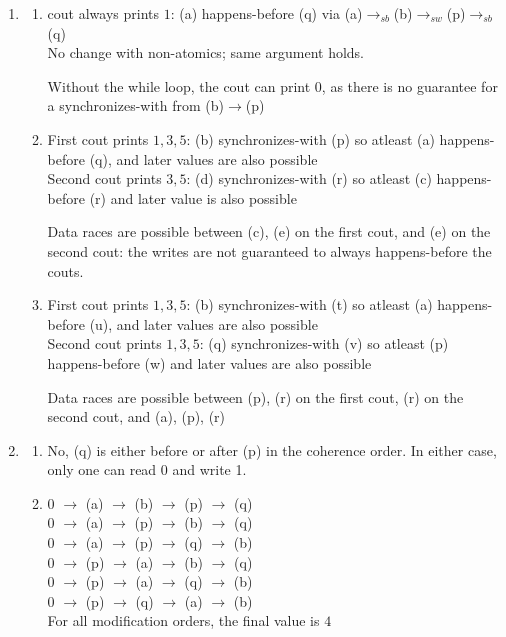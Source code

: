 \documentclass[12pt, a4paper]{article}
\begin{document}
\begin{enumerate}[Q\arabic*.]
  \item 
    \begin{enumerate}
      \item cout always prints $1$: (a) happens-before (q) via (a)$\rightarrow_{sb}$(b)$\rightarrow_{sw}$(p)$\rightarrow_{sb}$(q)\\
        No change with non-atomics; same argument holds. 

        Without the while loop, the cout can print $0$, as there is no guarantee for a synchronizes-with from (b)$\rightarrow$(p)

      \item First cout prints $1,3,5$: (b) synchronizes-with (p) so atleast (a) happens-before (q), and later values are also possible\\ 
        Second cout prints $3,5$: (d) synchronizes-with (r) so atleast (c) happens-before (r) and later value is also possible

        Data races are possible between (c), (e) on the first cout, and (e) on the second cout: the writes are not guaranteed to always happens-before the couts.

      \item First cout prints $1,3,5$: (b) synchronizes-with (t) so atleast (a) happens-before (u), and later values are also possible\\ 
        Second cout prints $1,3,5$: (q) synchronizes-with (v) so atleast (p) happens-before (w) and later values are also possible

        Data races are possible between (p), (r) on the first cout, (r) on the second cout, and (a), (p), (r) 
    \end{enumerate}

  \item 
    \begin{enumerate}
      \item No, (q) is either before or after (p) in the coherence order. In either case, only one can read 0 and write 1.

      \item 0 $\rightarrow$ (a) $\rightarrow$ (b) $\rightarrow$ (p) $\rightarrow$ (q)\\
        0 $\rightarrow$ (a) $\rightarrow$ (p) $\rightarrow$ (b) $\rightarrow$ (q)\\
        0 $\rightarrow$ (a) $\rightarrow$ (p) $\rightarrow$ (q) $\rightarrow$ (b)\\
        0 $\rightarrow$ (p) $\rightarrow$ (a) $\rightarrow$ (b) $\rightarrow$ (q)\\
        0 $\rightarrow$ (p) $\rightarrow$ (a) $\rightarrow$ (q) $\rightarrow$ (b)\\
        0 $\rightarrow$ (p) $\rightarrow$ (q) $\rightarrow$ (a) $\rightarrow$ (b)\\
        For all modification orders, the final value is $4$


\end{enumerate}
\end{enumerate}
\end{document}
